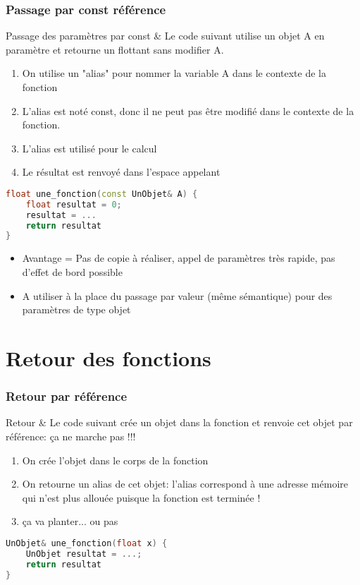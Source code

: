 \documentclass{beamer}
\begin{document}
\begin{frame}[fragile=singleslide,shrink=20]
\frametitle {Passage par const référence}

\begin{block}{Passage des paramètres par const \&}
Le code suivant utilise un objet A en paramètre et retourne un flottant sans modifier A.
\begin{enumerate}
\item On utilise un "alias" pour nommer la variable A dans le contexte de la fonction
\item L'alias est noté const, donc il ne peut pas être modifié dans le contexte de la fonction.
\item L'alias est utilisé pour le calcul
\item Le résultat est renvoyé dans l'espace appelant
\end{enumerate}
\end{block}

\begin{lstlisting}[language=c++]
float une_fonction(const UnObjet& A) {
    float resultat = 0;
    resultat = ...
    return resultat
}
\end{lstlisting}

\begin{block}{}
\begin{itemize}
\item Avantage = Pas de copie à réaliser, appel de paramètres très rapide, pas d'effet de bord possible
\item A utiliser à la place du passage par valeur (même sémantique) pour des paramètres de type objet
\end{itemize}
\end{block}
\end{frame}

\section{Retour des fonctions}

\begin{frame}[fragile=singleslide,shrink=20]
\frametitle {Retour par référence}

\begin{block}{Retour \&}
Le code suivant crée un objet dans la fonction et renvoie cet objet par référence: ça ne marche pas !!!

\begin{enumerate}
\item On crée l'objet dans le corps de la fonction
\item On retourne un alias de cet objet: l'alias correspond à une adresse mémoire qui n'est plus allouée puisque la fonction est terminée !
\item ça va planter... ou pas
\end{enumerate}
\end{block}

\begin{lstlisting}[language=c++]
UnObjet& une_fonction(float x) {
    UnObjet resultat = ...;
    return resultat
}
\end{lstlisting}
\end{frame}
\end{document}
